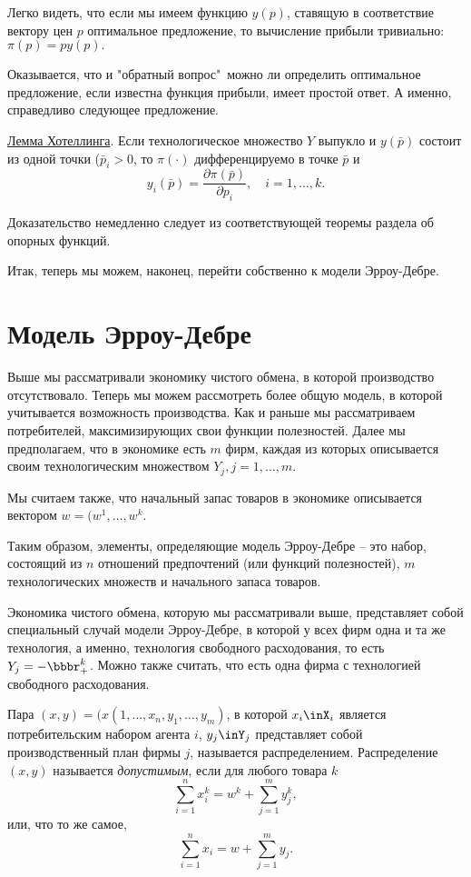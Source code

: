 Легко видеть, что если мы имеем функцию $y(p)$, ставящую в
соответствие вектору цен $p$ оптимальное предложение, то вычисление прибыли
тривиально: $\pi (p)=py(p).$

Оказывается, что и "обратный вопрос"\, можно ли определить оптимальное предложение,
если известна функция прибыли, имеет простой ответ. А именно, справедливо следующее предложение.


\underline{Лемма Хотеллинга}. Если технологическое множество $Y$ выпукло
и $y(\bar{p})$ состоит из одной точки ($\bar{p}_i>0$, то $\pi (\cdot)$
дифференцируемо в точке $\bar{p}$ и
$$
y_i(\bar p)={\frac{\partial\pi(\bar p)}{\partial p_i}},\quad
i=1,\ldots,k.
$$

Доказательство немедленно следует из соответствующей теоремы раздела об опорных функций.

Итак, теперь мы можем, наконец, перейти собственно к модели Эрроу-Дебре.



\section*{Модель Эрроу-Дебре}


Выше мы рассматривали экономику чистого обмена, в которой производство отсутствовало.
Теперь мы можем рассмотреть более общую модель, в которой учитывается возможность
производства. Как и раньше мы рассматриваем потребителей, максимизирующих свои функции
полезностей. Далее мы предполагаем, что в экономике есть $m$ фирм, каждая из которых описывается
своим технологическим множеством $Y_j, j=1,\ldots,m$.

Мы считаем также, что начальный запас товаров в экономике описывается вектором
$w=(w^1,\ldots,w^k$.

Таким образом, элементы, определяющие модель Эрроу-Дебре -- это
набор, состоящий из $n$ отношений предпочтений (или функций полезностей),
$m$ технологических множеств и начального запаса товаров.

Экономика чистого обмена, которую мы рассматривали выше, представляет собой
специальный случай модели Эрроу-Дебре, в которой у всех фирм одна и та же
технология, а именно, технология свободного расходования, то есть $Y_j=-\bbbr
^k_+$. Можно также считать, что есть одна фирма с технологией
свободного расходования.

Пара $(x,y)=(x(1,\ldots,x_n,y_1,\ldots,y_m)$, в которой
$x_i\inX_i$ является потребительским набором агента $i$, $y_j\inY_j$ представляет собой
производственный план фирмы $j$, называется распределением.
Распределение $(x,y)$ называется \emph{допустимым}, если для любого  товара $k$
$$
\sum^n_{i=1}x^k_i=w^k+\sum^m_{j=1}y^k_j,
$$
или, что то же самое,
$$
\sum^n_{i=1}x_i=w+\sum^m_{j=1}y_j.
$$

